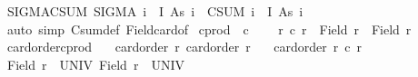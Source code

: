 \begin{isabellebody}
\isanewline
{}\isamarkupfalse%
\ SIGMA{\isacharunderscore}{\kern0pt}CSUM{\isacharcolon}{\kern0pt}\ {\isachardoublequoteopen}{\isacharbar}{\kern0pt}SIGMA\ i\ {\isacharcolon}{\kern0pt}\ I{\isachardot}{\kern0pt}\ As\ i{\isacharbar}{\kern0pt}\ {\isacharequal}{\kern0pt}\ {\isacharparenleft}{\kern0pt}CSUM\ i\ {\isacharcolon}{\kern0pt}\ {\isacharbar}{\kern0pt}I{\isacharbar}{\kern0pt}{\isachardot}{\kern0pt}\ {\isacharbar}{\kern0pt}As\ i{\isacharbar}{\kern0pt}\ {\isacharparenright}{\kern0pt}{\isachardoublequoteclose}\isanewline
%
\isadelimproof
%
\endisadelimproof
%
\isatagproof
{}\isamarkupfalse%
\ {\isacharparenleft}{\kern0pt}auto\ simp{\isacharcolon}{\kern0pt}\ Csum{\isacharunderscore}{\kern0pt}def\ Field{\isacharunderscore}{\kern0pt}card{\isacharunderscore}{\kern0pt}of{\isacharparenright}{\kern0pt}%
\endisatagproof
{\isafoldproof}%
%
\isadelimproof
%
\endisadelimproof
%
\isadelimdocument
%
\endisadelimdocument
%
\isatagdocument
%
\isamarkuptrue%
%
\endisatagdocument
{\isafolddocument}%
%
\isadelimdocument
%
\endisadelimdocument
{}\isamarkupfalse%
\ cprod\ {\isacharparenleft}{\kern0pt}\ {\isachardoublequoteopen}{\isacharasterisk}{\kern0pt}c{\isachardoublequoteclose}\ {}{}{\isacharparenright}{\kern0pt}\ \isanewline
\ \ {\isachardoublequoteopen}r{}\ {\isacharasterisk}{\kern0pt}c\ r{}\ {\isacharequal}{\kern0pt}\ {\isacharbar}{\kern0pt}Field\ r{}\ {\isasymtimes}\ Field\ r{}{\isacharbar}{\kern0pt}{\isachardoublequoteclose}\isanewline
\isanewline
{}\isamarkupfalse%
\ card{\isacharunderscore}{\kern0pt}order{\isacharunderscore}{\kern0pt}cprod{\isacharcolon}{\kern0pt}\isanewline
\ \ \ {\isachardoublequoteopen}card{\isacharunderscore}{\kern0pt}order\ r{}{\isachardoublequoteclose}\ {\isachardoublequoteopen}card{\isacharunderscore}{\kern0pt}order\ r{}{\isachardoublequoteclose}\isanewline
\ \ \ {\isachardoublequoteopen}card{\isacharunderscore}{\kern0pt}order\ {\isacharparenleft}{\kern0pt}r{}\ {\isacharasterisk}{\kern0pt}c\ r{}{\isacharparenright}{\kern0pt}{\isachardoublequoteclose}\isanewline
%
\isadelimproof
%
\endisadelimproof
%
\isatagproof
{}\isamarkupfalse%
\ {\isacharminus}{\kern0pt}\isanewline
\ \ \isamarkupfalse%
\ {\isachardoublequoteopen}Field\ r{}\ {\isacharequal}{\kern0pt}\ UNIV{\isachardoublequoteclose}\ {\isachardoublequoteopen}Field\ r{}\ {\isacharequal}{\kern0pt}\ UNIV{\isachardoublequoteclose}\ \isamarkupfalse%

\end{isabellebody}
